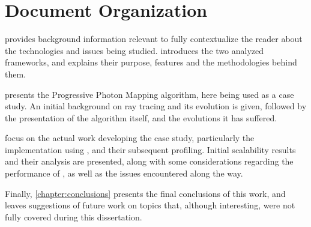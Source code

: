 \documentclass[main.tex]{subfiles}
\begin{document}
\section{Document Organization}

 provides background information relevant to fully contextualize the reader about the technologies and issues being studied.  introduces the two analyzed frameworks, and explains their purpose, features and the methodologies behind them.

 presents the Progressive Photon Mapping algorithm, here being used as a case study. An initial background on ray tracing and its evolution is given, followed by the presentation of the algorithm itself, and the evolutions it has suffered.

 focus on the actual work developing the case study, particularly the implementation using \starpu, and their subsequent profiling. Initial scalability results and their analysis are presented, along with some considerations regarding the performance of \starpu, as well as the issues encountered along the way.

Finally, \cref{chapter:conclusions} presents the final conclusions of this work, and leaves suggestions of future work on topics that, although interesting, were not fully covered during this dissertation.
\end{document}
